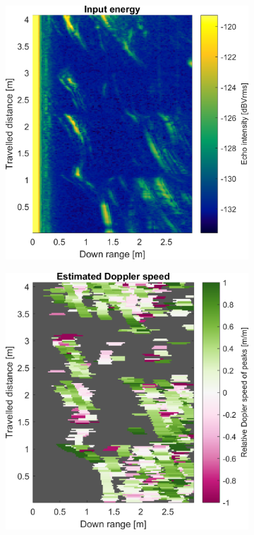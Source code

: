 \begin{figure}[htbp]
    \centering
    \begin{subfigure}[t]{0.475\linewidth}
        \centering
        \includegraphics[width=\linewidth,max height=.475\textheight]{gfx/results/torturechamber_input.png}
    \end{subfigure}%
    \hfill%
    \begin{subfigure}[t]{0.475\linewidth}
        \centering
        \includegraphics[width=\linewidth,max height=.475\textheight]{gfx/results/torturechamber_doppler.png}

\end{subfigure}
\end{figure}
